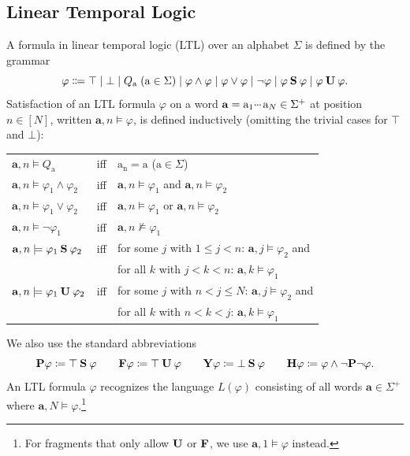 \documentclass{article} %
\newcommand{\opbf}[1]{\textnormal{\textbf{#1}}}
\newcommand{\past}{\opbf{P}}
\newcommand{\future}{\opbf{F}}
\newcommand{\history}{\opbf{H}}
\newcommand{\yesterday}{\opbf{Y}}
\newcommand{\since}{\mathbin{\opbf{S}}}
\newcommand{\until}{\mathbin{\opbf{U}}}
\newcommand{\bnfeq}{\Coloneqq}
\newcommand{\bnfdef}{\coloneqq}
\newcommand{\sym}[1]{\mathrm{#1}}
\newcommand{\str}[1]{#1}
\newcommand{\alphabet}{\Sigma}
\newcommand{\bword}{\mathbf{a}}
\newcommand{\Qprop}[1]{Q_{#1}}
\newcommand{\Lang}{L}
\newcommand{\mydots}{%
  \ifmmode
    \mathord{.}\mkern-1mu\mathord{.}\mkern-1mu\mathord{.}%
  \else
    .\kern-0.1em.\kern-0.1em.%
  \fi
}
\newcommand{\mycdots}{%
  \ifmmode
    \mathord{\raisebox{0.45ex}{\ensuremath{\mydots}}}\mkern2mu%
  \else
    \raisebox{0.45ex}{.\kern-0.1em.\kern-0.1em.}\kern0.1em%
  \fi
}
\renewcommand{\cdots}{\mycdots}%
\begin{document}
\subsection{Linear Temporal Logic}
A formula in linear temporal logic (LTL) over an alphabet $\alphabet$
is defined by the grammar
\[
    \varphi \bnfeq \top \mid \bot \mid \Qprop{\sym{a}} \; (\sym{a} \in \alphabet) \mid
    \varphi \wedge \varphi \mid \varphi \vee \varphi \mid \neg\varphi
    \mid \varphi \since \varphi \mid \varphi \until \varphi.
\]
Satisfaction of an LTL formula $\varphi$ on a word $\str{\bword} = \sym{a}_1 \cdots \sym{a}_N \in
\alphabet^+$ at position $n \in [N]$, written $\str{\bword}, n \models \varphi$, is
defined inductively (omitting the trivial cases for $\top$ and $\bot$):
\begin{center}
\begin{tabular}{l l l}
$\str{\bword},n \models \Qprop{\sym{a}}$ & iff & $\sym{a_n} = \sym{a}$ \qquad ($\sym{a} \in \alphabet$)\\
$\str{\bword},n \models \varphi_1 \wedge \varphi_2$ & iff &
    $\str{\bword},n \models \varphi_1$ and $\str{\bword},n \models \varphi_2$\\
$\str{\bword},n \models \varphi_1 \vee \varphi_2$ & iff &
    $\str{\bword},n \models \varphi_1$ or $\str{\bword},n \models \varphi_2$\\
$\str{\bword},n \models \neg\varphi_1$ & iff &
    $\str{\bword},n \not\models \varphi_1$\\
$\str{\bword},n \models \varphi_1 \since \varphi_2$ & iff &
    for some $j$ with $1 \le j < n$: $\str{\bword},j \models \varphi_2$ and \\
&& for all $k$ with $j < k < n$: $\str{\bword},k \models \varphi_1$\\
$\str{\bword},n \models \varphi_1 \until \varphi_2$ & iff &
    for some $j$ with $n < j \le N$: $\str{\bword},j \models \varphi_2$ and \\
&& for all $k$ with $n < k < j$: $\str{\bword},k \models \varphi_1$
\end{tabular}
\end{center}
We also use the standard abbreviations
\[
    \past\varphi \bnfdef \top \since \varphi \qquad
    \future\varphi \bnfdef \top \until \varphi \qquad
    \yesterday\varphi \bnfdef \bot \since \varphi \qquad
    \history\varphi \bnfdef \varphi \wedge \neg\past\neg\varphi.
\]
An LTL formula $\varphi$ recognizes the language $\Lang(\varphi)$ consisting
of all words $\str{\bword} \in \alphabet^+$ where $\str{\bword}, N \models \varphi$.\footnote{For fragments that only allow $\until$ or $\future$, we use $\str{\bword}, 1 \models \varphi$ instead.}
\end{document}
